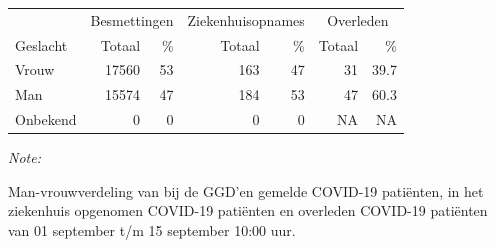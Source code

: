 \documentclass[
  english,
  man,floatsintext]{apa6}
\begin{document}
\begin{table}
\centering\begingroup\fontsize{11}{13}\selectfont

\begin{threeparttable}
\begin{tabular}{lrrrrrr}
\toprule
\multicolumn{1}{c}{ } & \multicolumn{2}{c}{Besmettingen} & \multicolumn{2}{c}{Ziekenhuisopnames} & \multicolumn{2}{c}{Overleden} \\
\cmidrule(l{3pt}r{3pt}){2-3} \cmidrule(l{3pt}r{3pt}){4-5} \cmidrule(l{3pt}r{3pt}){6-7}
Geslacht & Totaal & \% & Totaal & \% & Totaal & \%\\
\midrule
Vrouw & 17560 & 53 & 163 & 47 & 31 & 39.7\\
Man & 15574 & 47 & 184 & 53 & 47 & 60.3\\
Onbekend & 0 & 0 & 0 & 0 & NA & NA\\
\bottomrule
\end{tabular}
\begin{tablenotes}
\item \textit{Note: } 
\item Man-vrouwverdeling van bij de GGD’en gemelde COVID-19 patiënten, in het ziekenhuis opgenomen COVID-19 patiënten en overleden COVID-19 patiënten van 01 september t/m 15 september 10:00 uur.
\end{tablenotes}
\end{threeparttable}
\endgroup{}
\end{table}
\newpage
\end{document}
